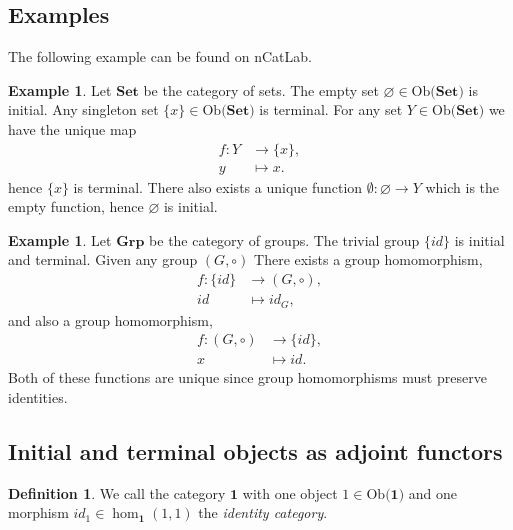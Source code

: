 \documentclass[11pt,a4paper]{article}
\theoremstyle{definition}
\newtheorem{definition}[thm]{Definition}
\newtheorem{example}[thm]{Example}
\newcommand\ho[3][]{\hom_{#1}(#2,#3)}
\newcommand\ob[1]{\mathrm{Ob(}#1\mathrm{)}}
\numberwithin{equation}{section}
\begin{document}
\subsection{Examples}
\label{ss:initermexe}

The following example can be found on nCatLab\cite{nLab}.
\begin{example}
    Let $\mathbf{Set}$ be the category of sets. The empty set $\varnothing\in\ob{\mathbf{Set}}$ is initial. Any singleton set $\{x\}\in\ob{\mathbf{Set}}$ is terminal.
    For any set $Y\in\ob{\mathbf{Set}}$ we have the unique map
    \begin{align*}
        f\colon Y &\to \{x\},\\
        y &\mapsto x.
    \end{align*}
    hence $\{x\}$ is terminal.
    There also exists a unique function $\emptyset\colon \varnothing\to Y$ which is the empty function, hence $\varnothing$ is initial.
\end{example}

\begin{example}
    Let $\mathbf{Grp}$ be the category of groups. The trivial group $\{id\}$ is initial and terminal. Given any group $(G,\circ)$ There exists a group homomorphism,
    \begin{align*}
        f\colon \{id\}&\to (G,\circ),\\
        id&\mapsto id_{G},
    \end{align*}
    and also a group homomorphism,
    \begin{align*}
        f\colon (G,\circ)&\to \{id\},\\
        x&\mapsto id.
    \end{align*}
    Both of these functions are unique since group homomorphisms must preserve identities.
\end{example}

\subsection{Initial and terminal objects as adjoint functors}
\label{ss:initermadj}

\begin{definition}
    \label{def:identitycat}
    We call the category $\mathbf{1}$ with one object $1\in\ob{\mathbf{1}}$ and one morphism $id_{1}\in\ho[\mathbf{1}]{1}{1}$ the \emph{identity category}.
\end{definition}
\end{document}
